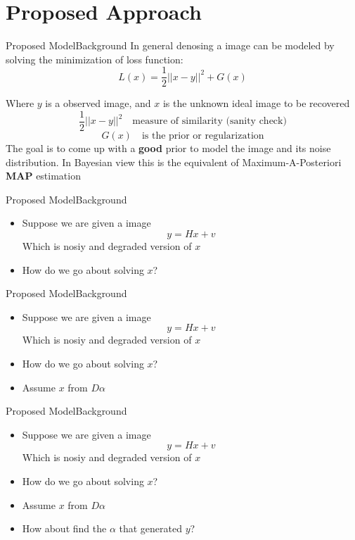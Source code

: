 \documentclass{beamer}
\begin{document}
\section{Proposed Approach}

\begin{frame}{Proposed Model}{Background}
In general denosing a image can be modeled by solving the minimization of loss function:
\[
    L(x) = \frac{1}{2}||x-y||^2 + G(x) 
\]

Where $y$ is a observed image, and $x$ is the unknown ideal image to be recovered \[
\frac{1}{2}||x-y||^2 \quad \textrm{measure of similarity (sanity check)}
\]
\[
G(x) \quad \textrm{is the prior or regularization}
\]
The goal is to come up with a \textbf{good} prior to model the image and its noise distribution. In Bayesian view this is the equivalent of Maximum-A-Posteriori \textbf{MAP} estimation
\end{frame}


\begin{frame}{Proposed Model}{Background}
\begin{itemize}
    \item Suppose we are given a image 
    \[ y=Hx+v \]
    Which is nosiy and degraded version of $x$
    \item How do we go about solving $x$?
\end{itemize}
\end{frame}


\begin{frame}{Proposed Model}{Background}
\begin{itemize}
    \item Suppose we are given a image 
    \[ y=Hx+v \]
    Which is nosiy and degraded version of $x$
    \item How do we go about solving $x$?
    \item Assume $x$ from $D\alpha$
\end{itemize}
\end{frame}

\begin{frame}{Proposed Model}{Background}
\begin{itemize}
    \item Suppose we are given a image 
    \[ y=Hx+v \]
    Which is nosiy and degraded version of $x$
    \item How do we go about solving $x$?
    \item Assume $x$ from $D\alpha$
    \item How about find the $\alpha$ that generated $y$?
\end{itemize}
\end{frame}
\end{document}
